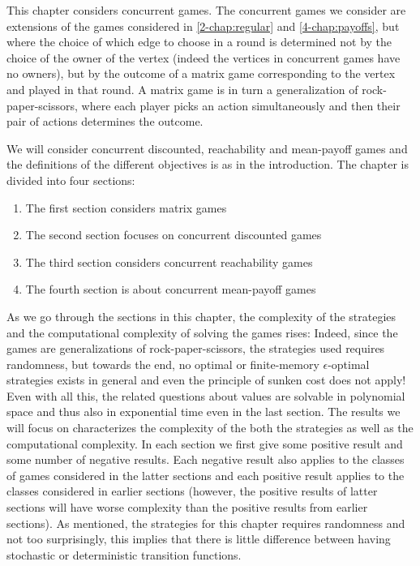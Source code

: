

This chapter considers concurrent games. The concurrent games we consider are extensions of the games considered in \cref{2-chap:regular} and \cref{4-chap:payoffs}, but where the choice of which edge to choose in a round is determined not by the choice of the owner of the vertex (indeed the vertices in concurrent games have no owners), but by the outcome of a matrix game corresponding to the vertex and played in that round. 
A matrix game is in turn a generalization of rock-paper-scissors, where each player picks an action simultaneously and then their pair of actions determines the outcome.

We will consider concurrent discounted, reachability and mean-payoff games and the definitions of the different objectives is as in the introduction. 
The chapter is divided into four sections:
\begin{enumerate}
\item The first section considers matrix games
\item The second section focuses on concurrent discounted games
\item The third section considers concurrent reachability games
\item The fourth section is about concurrent mean-payoff games
\end{enumerate}
As we go through the sections in this chapter, the complexity of the strategies and the computational complexity of solving the games rises: Indeed, since the games are generalizations of rock-paper-scissors, the strategies used requires randomness, but towards the end, no optimal or finite-memory $\epsilon$-optimal strategies exists in general and even the principle of sunken cost does not apply! 
Even with all this, the related questions about values are solvable in polynomial space and thus also in exponential time even in the last section.
The results we will focus on characterizes the complexity of the both the strategies as well as the computational complexity.
In each section we first give some positive result and some number of negative results. Each negative result also applies to the classes of games considered in the latter sections and each positive result applies to the classes considered in earlier sections (however, the positive results of latter sections will have worse complexity than the positive results from earlier sections).
As mentioned, the strategies for this chapter requires randomness and not too surprisingly, this implies that there is little difference between having stochastic or deterministic transition functions.

